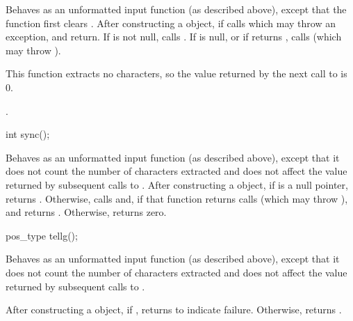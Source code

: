 \begin{itemdescr}
\pnum
\effects
Behaves as an unformatted input function (as described above), except that the function first clears .
After constructing
a  object, if
calls
which may throw an exception,
and return.
If
is not null, calls
.
If
is null, or if
returns
,
calls
(which may throw
).
\begin{note}
This
function extracts no characters, so the value returned by the next call to
is 0.
\end{note}

\pnum
\returns
{}.
\end{itemdescr}

%
\begin{itemdecl}
int sync();
\end{itemdecl}

\begin{itemdescr}
\pnum
\effects
Behaves as an unformatted input function (as described above), except that it does not
count the number of characters extracted and does not affect the
value returned by subsequent calls to
.
After constructing
a  object, if
is a null pointer, returns .
Otherwise, calls
and, if that function returns 
calls
(which may throw
),
and returns
.
Otherwise, returns zero.
\end{itemdescr}

%
\begin{itemdecl}
pos_type tellg();
\end{itemdecl}

\begin{itemdescr}
\pnum
\effects
Behaves as an unformatted input function (as described above), except that it does not count
the number of characters extracted and does not affect the value
returned by subsequent calls to
.

\pnum
\returns
After constructing a  object, if
,
returns
to indicate failure.
Otherwise, returns
.
\end{itemdescr}

